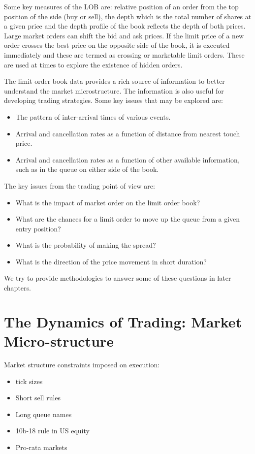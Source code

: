 Some key measures of the LOB are: relative position of an order from the top position of the side (buy or sell), the depth which is the total number of shares at a given price and the depth profile of the book reflects the depth of both prices. Large market orders can shift the bid and ask prices. If the limit price of a new order crosses the best price on the opposite side of the book, it is executed immediately and these are termed as crossing or marketable limit orders. These are used at times to explore the existence of hidden orders.


The limit order book data provides a rich source of information to better understand the market microstructure. The information is also useful for developing trading strategies. Some key issues that may be explored are:
        \begin{itemize}
        \item The pattern of inter-arrival times of various events.
        \item Arrival and cancellation rates as a function of distance from nearest touch price.
        \item Arrival and cancellation rates as a function of other available information, such as in the queue on either side of the book.
        \end{itemize}
The key issues from the trading point of view are:
        \begin{itemize}
        \item What is the impact of market order on the limit order book?
        \item What are the chances for a limit order to move up the queue from a given entry position?
        \item What is the probability of making the spread?
        \item What is the direction of the price movement in short duration?
        \end{itemize}

We try to provide methodologies to answer some of these questions in later chapters.



\section{The Dynamics of Trading: Market Micro-structure}

Market structure constraints imposed on execution:

\begin{itemize}
\item tick sizes
\item Short sell rules
\item Long queue names
\item 10b-18 rule in US equity
\item Pro-rata markets
\end{itemize}

